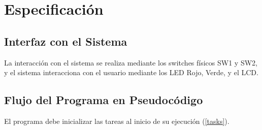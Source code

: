 \documentclass[a4paper,openright,12pt]{article}
\begin{document}
\section{Especificación}
\subsection{Interfaz con el Sistema}\label{design_button_translation}
La interacción con el sistema se realiza mediante los switches físicos SW1 y SW2, y el sistema interacciona con el usuario mediante los LED Rojo, Verde, y el LCD.

\subsection{Flujo del Programa en Pseudocódigo}\label{pseudo_program_flow}
El programa debe inicializar las tareas al inicio de su ejecución (\ref{tasks}).
\end{document}

